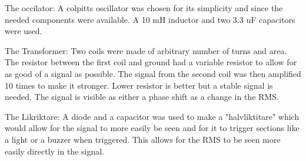 % 

The occilator:
A colpitts oscillator was chosen for its simplicity and since the needed components were available. A 10 mH inductor and two 
3.3 uF capacitors were used.

The Transformer:
Two coils were made of arbitrary number of turns and area. The resistor between the first coil and ground had a variable resistor to allow
 for as good of a signal as possible. The signal from the second coil was then amplified 10 times to make it stronger. 
 Lower resistor is better but a stable signal is needed. The signal is visible as either a phase shift as a change in the RMS.

The Likriktare:
A diode and a capacitor was used to make a "halvliktitare" which would allow for the signal to more easily be seen and for it to trigger
 sections like a light or a buzzer when triggered. This allows for the RMS to be seen more easily directly in the signal.